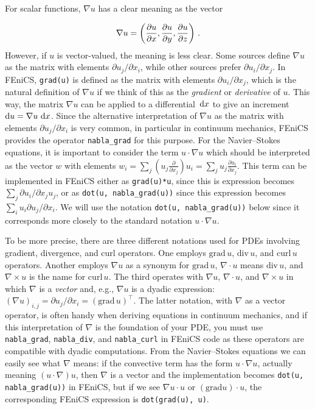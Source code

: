 \documentclass[graybox,envcountchap,sectrefs,final]{svmonodo}
\newenvironment{warning_mdfboxadmon}[1][]{
\begin{warning_mdfboxmdframed}[frametitle=#1]
}
{
\end{warning_mdfboxmdframed}
}
\begin{document}
\begin{warning_mdfboxadmon}
For scalar functions, $\nabla u$ has a clear meaning as the vector

\[ \nabla u =\left(\frac{\partial u}{\partial x}, \frac{\partial u}{\partial y},
\frac{\partial u}{\partial z}\right)\thinspace .\]
However, if $u$ is vector-valued, the meaning is less clear.
Some sources define $\nabla u$ as the matrix with elements
$\partial u_j / \partial x_i$, while other sources prefer
$\partial u_i / \partial x_j$. In FEniCS, \texttt{grad(u)} is defined as the
matrix with elements $\partial u_i / \partial x_j$, which is the
natural definition of $\nabla u$ if we think of this as the \emph{gradient} or
\emph{derivative} of $u$. This way, the matrix $\nabla u$ can be applied to
a differential $\, \mathrm{d}x$ to give an increment $\mathrm{d}u = \nabla u \,
\, \mathrm{d}x$. Since the alternative interpretation of $\nabla u$ as the matrix
with elements $\partial u_j / \partial x_i$ is very common, in
particular in continuum mechanics, FEniCS
provides the operator \Verb!nabla_grad! for this purpose.
For the Navier--Stokes equations, it is important to consider the
term $u \cdot \nabla u$ which should be interpreted as the vector
$w$ with elements
$w_i = \sum_j \left(u_j \frac{\partial}{\partial x_j}\right) u_i
     = \sum_j u_j \frac{\partial u_i}{\partial x_j}$.
This term can be implemented in FEniCS either as
\texttt{grad(u)*u}, since this is expression becomes
$\sum_j \partial u_i/\partial x_j u_j$, or as
\Verb!dot(u, nabla_grad(u))! since this expression becomes
$\sum_i u_i \partial u_j/\partial x_i$. We will use the notation
\Verb!dot(u, nabla_grad(u))! below since it corresponds more closely
to the standard notation $u \cdot \nabla u$.

To be more precise, there are three different notations used for PDEs
involving gradient, divergence, and curl operators.  One employs
$\mathrm{grad}\, u$, $\mathrm{div}\, u$, and $\mathrm{curl}\, u$
operators. Another employs $\nabla u$ as a synonym for
$\mathrm{grad}\, u$, $\nabla\cdot u$ means $\mathrm{div}\, u$, and
$\nabla\times u$ is the name for $\mathrm{curl}\, u$. The third
operates with $\nabla u$, $\nabla\cdot u$, and $\nabla\times u$ in
which $\nabla$ is a \emph{vector} and, e.g., $\nabla u$ is a dyadic
expression: $(\nabla u)_{i,j} = \partial u_j/\partial x_i =
(\mathrm{grad}\,u)^{\top}$. The latter notation, with $\nabla$ as a
vector operator, is often handy when deriving equations in continuum
mechanics, and if this interpretation of $\nabla$ is the foundation of
your PDE, you must use \Verb!nabla_grad!, \Verb!nabla_div!, and \Verb!nabla_curl! in
FEniCS code as these operators are compatible with dyadic
computations.  From the Navier--Stokes equations we can easily see
what $\nabla$ means: if the convective term has the form $u\cdot
\nabla u$, actually meaning $(u\cdot\nabla) u$, then $\nabla$ is a
vector and the implementation becomes \Verb!dot(u, nabla_grad(u))! in
FEniCS, but if we see $\nabla u\cdot u$ or $(\mathrm{grad} u)\cdot u$,
the corresponding FEniCS expression is \texttt{dot(grad(u), u)}.


\end{warning_mdfboxadmon}
\end{document}
